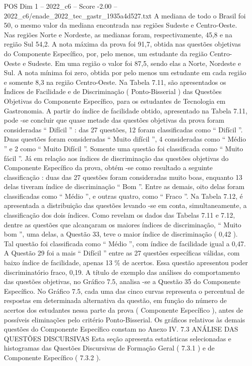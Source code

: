 \begin{textsample}{POS Dim 1 – 2022\_c6 – Score -2.00 – 2022\_c6/enade\_2022\_tec\_gastr\_1935a4d527.txt}
A mediana de todo o Brasil foi 50, o mesmo valor da mediana encontrada nas regiões Sudeste e Centro-Oeste.
Nas regiões Norte e Nordeste, as medianas foram, respectivamente, 45,8 e na região Sul 54,2.
A nota máxima da prova foi 91,7, obtida nas questões objetivas do Componente Específico, por, pelo menos, um estudante da região Centro-Oeste e Sudeste.
Em uma região o valor foi 87,5, sendo elas a Norte, Nordeste e Sul.
A nota mínima foi zero, obtida por pelo menos um estudante em cada região e somente 8,3 na região Centro-Oeste.
Na Tabela 7.11, são apresentados os Índices de Facilidade e de Discriminação ( Ponto-Bisserial ) das Questões Objetivas do Componente Específico, para os estudantes de Tecnologia em Gastronomia.
A partir do índice de facilidade obtido, apresentado na Tabela 7.11, pode -se concluir que quase metade das questões objetivas da prova foram consideradas “ Difícil ” : das 27 questões, 12 foram classificadas como “ Difícil ”.
Duas questões foram consideradas “ Muito difícil ”, 4 consideradas como “ Médio ” e 2 como “ Muito Difícil ”.
Somente uma questão foi classificada como “ Muito fácil ”.
Já em relação aos índices de discriminação das questões objetivas do Componente Específico da prova, obtém -se como resultado a seguinte classificação : duas das 27 questões foram consideradas muito boas, enquanto 13 delas tiveram índice de discriminação “ Bom ”.
Entre as demais, oito delas foram classificadas como “ Médio ”, e outras quatro, como “ Fraco ”.
Na Tabela 7.12, é apresentada a distribuição das questões levando -se em conta, simultaneamente, a classificação dos dois índices.
Como revelam os dados das Tabelas 7.11 e 7.12, dentre as questões que alcançaram os maiores índices de discriminação, “ Muito bom ”, uma delas, a Questão 33, teve o maior índice de discriminação ( 0,42 ).
Tal questão foi classificada como “ Médio ”, com índice de facilidade igual a 0,47.
A Questão 29 foi a mais “ Difícil ” entre as 27 questões específicas válidas, com baixo índice de facilidade, apenas 13 \% de acertos.
Essa questão apresentou poder discriminatório fraco, 0,19.
A título de exemplo das análises do comportamento das questões objetivas, no Gráfico 7.5, analisa -se a Questão 35 do Componente Específico.
No Gráfico 7.5, cada uma das cinco curvas representa o percentual de respostas em determinada alternativa da questão, em função do número de acertos dos estudantes nessa parte da prova ( Componente Específico ), antes de possíveis eliminações pelo critério Ponto-Bisserial.
Os gráficos relativos às demais questões do Componente Específico constam no Anexo IV. 7.3 ANÁLISE DAS QUESTÕES DISCURSIVAS Esta seção apresenta estatísticas selecionadas e histogramas das Questões Discursivas de Formação Geral ( 7.3.1 ) e de Componente Específico ( 7.3.2 ).

\end{textsample}
